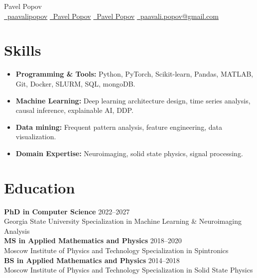 \documentclass[11pt,a4paper]{article}
\begin{document}
\begin{center}
  {\Huge Pavel Popov}\\[0.5em]
  \href{https://github.com/paavalipopov}{\faGithub\ paavalipopov} \quad
  \href{https://www.linkedin.com/in/pavel-popov-83b69a123/}{\faLinkedin\ Pavel Popov} \quad
  \href{https://scholar.google.com/citations?user=4alUD5UAAAAJ}{\aiGoogleScholar\ Pavel Popov} \quad
  \href{mailto:paavali.popov@gmail.com}{\faEnvelope\  paavali.popov@gmail.com}
\end{center}

\section*{Skills}
\begin{itemize}
[leftmargin=*,noitemsep]
\item \textbf{Programming \& Tools:} Python, PyTorch, Scikit-learn, Pandas, MATLAB, Git, Docker, SLURM, SQL, mongoDB.
\item \textbf{Machine Learning:} Deep learning architecture design, time series analysis, causal inference, explainable AI, DDP.
\item \textbf{Data mining:} Frequent pattern analysis, feature engineering, data visualization.
\item \textbf{Domain Expertise:} Neuroimaging, solid state physics, signal processing.

\end{itemize}

\section*{Education}
\textbf{PhD in Computer Science} \hfill 2022--2027\\
Georgia State University \hfill
Specialization in Machine Learning \& Neuroimaging Analysis\\

\textbf{MS in Applied Mathematics and Physics} \hfill 2018--2020\\
Moscow Institute of Physics and Technology \hfill Specialization in Spintronics\\

\textbf{BS in Applied Mathematics and Physics} \hfill 2014--2018\\
Moscow Institute of Physics and Technology \hfill Specialization in Solid State Physics
\end{document}
